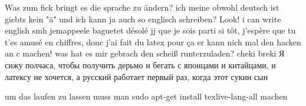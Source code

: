 \documentclass{article}
\begin{document}
		Was zum fick bringt es die sprache zu ändern?
		ich meine obwohl deutsch ist giebts kein "ä" und ich kann ja
		auch so englisch schreiben? Look! i can write english
		smh
		jemappeele baguetet
		désolé jj que je sois parti si tôt, j'espère que tu t'es amusé en chiffres,
		 donc j'ai fait du latex pour ça
		 er kann nich mal den hacken an c machen! was hat es mir gebrach den scheiß runterzuladen?
	cheki breki
	Я сижу полчаса, чтобы получить дерьмо и бегать с японцами и китайцами, и латексу не хочется, а русский работает первый раз, когда этот сукин сын
	
	um das laufen zu lassen muss man sudo apt-get install texlive-lang-all
	machen

	
	
\end{document}

